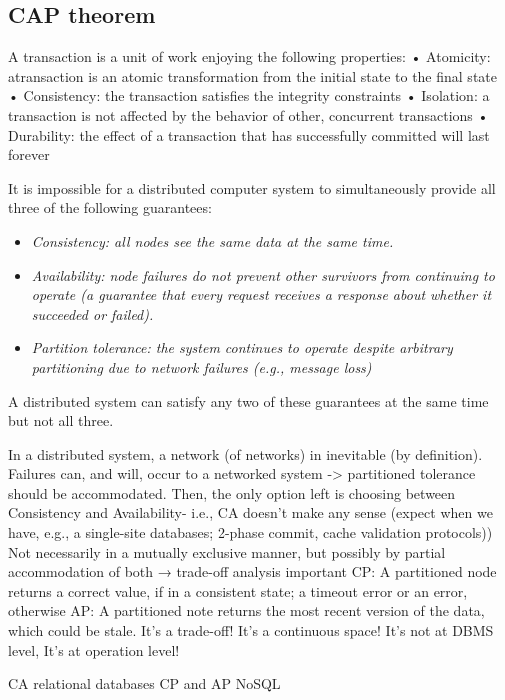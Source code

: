 \subsection{CAP theorem}
A transaction is a unit of work enjoying the following properties:
• Atomicity: atransaction is an atomic transformation from the initial state to the final state
• Consistency: the transaction satisfies the integrity constraints
• Isolation: a  transaction is not affected by the behavior of other, concurrent transactions
• Durability: the effect of a transaction that has successfully committed will last forever
\begin{theorem}
    It is impossible for a distributed computer system to simultaneously provide all three of the following guarantees:
\end{theorem}
\begin{itemize}
    \item \textit{Consistency: all nodes see the same data at the same time.}
    \item \textit{Availability: node failures do not prevent other survivors from continuing to operate (a guarantee that every request receives a response about whether it succeeded or failed).}
    \item \textit{Partition tolerance: the system continues to operate despite arbitrary partitioning due to network failures (e.g., message loss)}
\end{itemize}
A distributed system can satisfy any two of these guarantees at the same time but not all three.

In a distributed system, a network (of networks) in inevitable (by definition).
Failures can, and will, occur to a networked system -> partitioned tolerance should be accommodated.
Then, the only option left is choosing between Consistency and Availability- i.e., CA doesn’t make any sense (expect
when we have, e.g., a single-site databases; 2-phase commit, cache validation protocols))
Not necessarily in a mutually exclusive manner, but possibly by partial accommodation of both
→ trade-off analysis important
CP: A partitioned node returns
a correct value, if in a consistent state;
a timeout error or an error, otherwise
AP: A partitioned note returns the most recent version of the data, which could be stale.
It’s a trade-off!
It’s a
continuous
space!
It’s not at
DBMS level,
It’s at
operation level!

CA relational databases 
CP and AP NoSQL

